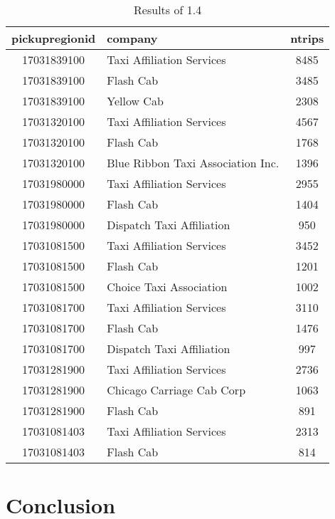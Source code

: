 \documentclass[conference,compsoc]{IEEEtran}
\begin{document}
\begin{table}[!t]
\renewcommand{\arraystretch}{1.4}
\caption{Results of  1.4}
\label{perf_1_4}
\centering
\begin{tabular}{c||l|c}
\hline
\bfseries pickupregionid &\bfseries company   & \bfseries ntrips \\
\hline\hline
17031839100 &Taxi Affiliation Services        & 8485  \\
17031839100 &Flash Cab                        & 3485  \\
17031839100 &Yellow Cab                       & 2308  \\
\hline
17031320100 &Taxi Affiliation Services        & 4567  \\
17031320100 &Flash Cab                        & 1768  \\
17031320100 &Blue Ribbon Taxi Association Inc.& 1396  \\
\hline
17031980000 &Taxi Affiliation Services        & 2955  \\
17031980000 &Flash Cab                        & 1404  \\
17031980000 &Dispatch Taxi Affiliation        & 950   \\
\hline
17031081500 &Taxi Affiliation Services        & 3452  \\
17031081500 &Flash Cab                        & 1201  \\
17031081500 &Choice Taxi Association          & 1002  \\
\hline
17031081700 &Taxi Affiliation Services        & 3110  \\
17031081700 &Flash Cab                        & 1476  \\
17031081700 &Dispatch Taxi Affiliation        & 997   \\
\hline
17031281900 &Taxi Affiliation Services        & 2736  \\
17031281900 &Chicago Carriage Cab Corp        & 1063  \\
17031281900 &Flash Cab                        & 891   \\
\hline
17031081403 &Taxi Affiliation Services        & 2313  \\
17031081403 &Flash Cab                        & 814   \\
\hline
\end{tabular}
\end{table}

\section{Conclusion}
\end{document}
